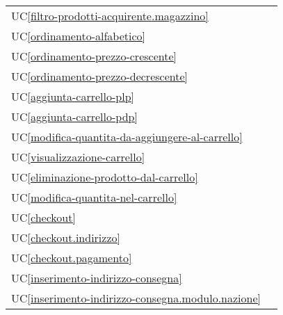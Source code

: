 \begin{longtable}{C{6cm} C{6cm}}
    UC\ref{filtro-prodotti-acquirente.magazzino} &  \\

    UC\ref{ordinamento-alfabetico} &  \\

	UC\ref{ordinamento-prezzo-crescente} &  \\

    UC\ref{ordinamento-prezzo-decrescente} &  \\

	UC\ref{aggiunta-carrello-plp} &  \\

    UC\ref{aggiunta-carrello-pdp} &  \\

	UC\ref{modifica-quantita-da-aggiungere-al-carrello} &  \\

    UC\ref{visualizzazione-carrello} &  \newline {} \\

    UC\ref{eliminazione-prodotto-dal-carrello} &  \\

	UC\ref{modifica-quantita-nel-carrello} &  \\

    UC\ref{checkout} &  \\

	UC\ref{checkout.indirizzo} &  \\

    UC\ref{checkout.pagamento} &  \\

    UC\ref{inserimento-indirizzo-consegna} &  \\

	UC\ref{inserimento-indirizzo-consegna.modulo.nazione} &  \\


\end{longtable}
